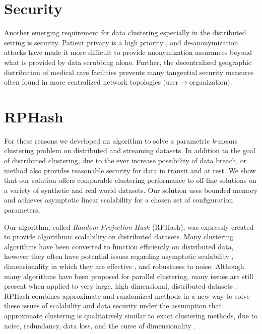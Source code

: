 \section{Security}
Another emerging requirement for data clustering especially in the distributed setting is security.  Patient privacy is
a high priority \cite{presidential}, and de-anonymization attacks have made it more difficult to provide anonymization
assurances beyond what is provided by data scrubbing alone.  Further, the decentralized geographic distribution of
medical care facilities prevents many tangential security measures often found in more centralized network topologies
(user$\rightarrow$organization).

\section{RPHash}
For these reasons we developed an algorithm to solve a parametric $k$-means clustering problem on distributed and
streaming datasets. In addition to the goal of distributed clustering, due to the ever increase possibility of data
breach, or method also provides reasonable security for data in transit and at rest.  We show that our solution offers 
comparable clustering performance to off-line solutions on a variety of synthetic and real world datasets.  Our 
solution uses bounded memory and achieves asymptotic linear scalability for a chosen set of configuration parameters.

Our algorithm, called \emph{Random Projection Hash} (\textsf{RPHash}), was expressly created to provide algorithmic
scalability on distributed datasets.  Many clustering algorithms have been converted to function efficiently on
distributed data, however they often have potential issues regarding asymptotic scalability \cite{Proclus},
dimensionality in which they are effective \cite{Clarans}, and robustness to noise.  Although many algorithms have been
proposed for parallel clustering, many issues are still present when applied to very large, high dimensional,
distributed datasets \cite{Clarans,Proclus,mpicluster,distributeddata,parclus}.  \textsf{RPHash} combines approximate and
randomized methods in a new way to solve these issues of scalability and data security under the assumption that
approximate clustering is qualitatively similar to exact clustering methods, due to noise, redundancy, data loss, and
the curse of dimensionality \cite{Beyer1999}.

